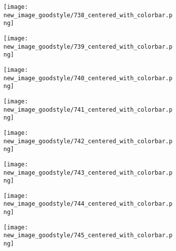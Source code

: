 \documentclass[a4paper,12pt]{article}
\begin{document}
\begin{figure}[H]
  \begin{subfigure}{0.11\textwidth}
    \texttt{[image: new\_image\_goodstyle/738\_centered\_with\_colorbar.png]}
  \end{subfigure}
  \hfill
  \begin{subfigure}{0.11\textwidth}
    \texttt{[image: new\_image\_goodstyle/739\_centered\_with\_colorbar.png]}
  \end{subfigure}
  \hfill
  \begin{subfigure}{0.11\textwidth}
    \texttt{[image: new\_image\_goodstyle/740\_centered\_with\_colorbar.png]}
  \end{subfigure}
  \hfill
  \begin{subfigure}{0.11\textwidth}
    \texttt{[image: new\_image\_goodstyle/741\_centered\_with\_colorbar.png]}
  \end{subfigure}
  \hfill
  \begin{subfigure}{0.11\textwidth}
    \texttt{[image: new\_image\_goodstyle/742\_centered\_with\_colorbar.png]}
  \end{subfigure}
  \hfill
  \begin{subfigure}{0.11\textwidth}
    \texttt{[image: new\_image\_goodstyle/743\_centered\_with\_colorbar.png]}
  \end{subfigure}
  \hfill
  \begin{subfigure}{0.11\textwidth}
    \texttt{[image: new\_image\_goodstyle/744\_centered\_with\_colorbar.png]}
  \end{subfigure}
  \hfill
  \begin{subfigure}{0.11\textwidth}
    \texttt{[image: new\_image\_goodstyle/745\_centered\_with\_colorbar.png]}
  \end{subfigure}
  \hfill
\end{figure}
\end{document}
